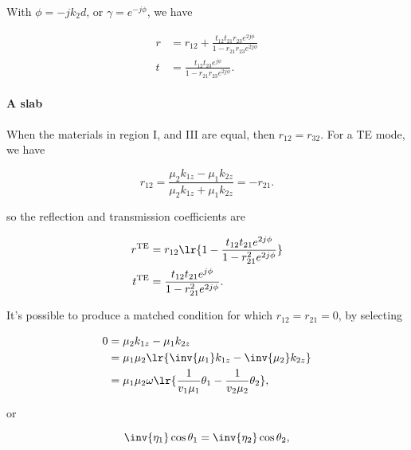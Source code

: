 With \( \phi = -j k_2 d \), or \( \gamma = e^{-j\phi} \), we have

\begin{dmath}\label{eqn:twoInterfaceNormal:180}
\boxed{
\begin{aligned}
r &= r_{12} + \frac{t_{12} t_{21} r_{23} e^{2 j \phi} }{1 - r_{21} r_{23} e^{2 j \phi}} \\
t &= \frac{ t_{12} t_{23} e^{j\phi}}{1 - r_{21} r_{23} e^{2 j \phi}}.
\end{aligned}
}
\end{dmath}

\paragraph{A slab}

When the materials in region I, and III are equal, then \( r_{12} = r_{32} \).  For a TE mode, we have

\begin{equation}\label{eqn:twoInterfaceNormal:200}
r_{12}
=
\frac{\mu_2 k_{1z} - \mu_1 k_{2z}}{\mu_2 k_{1z} + \mu_1 k_{2z}}
= -r_{21}.
\end{equation}

so the reflection and transmission coefficients are

\begin{dmath}\label{eqn:twoInterfaceNormal:220}
\begin{aligned}
r^{\textrm{TE}} &= r_{12} \lr{ 1 - \frac{t_{12} t_{21} e^{2 j \phi} }{1 - r_{21}^2 e^{2 j \phi}} } \\
t^{\textrm{TE}} &= \frac{ t_{12} t_{21} e^{j\phi}}{1 - r_{21}^2 e^{2 j \phi}}.
\end{aligned}
\end{dmath}

It's possible to produce a matched condition for which \( r_{12} = r_{21} = 0 \), by selecting

\begin{dmath}\label{eqn:twoInterfaceNormal:240}
\begin{aligned}
0
&= \mu_2 k_{1z} - \mu_1 k_{2z} \\
&= \mu_1 \mu_2 \lr{ \inv{\mu_1} k_{1z} - \inv{\mu_2} k_{2z} } \\
&= \mu_1 \mu_2 \omega \lr{ \frac{1}{v_1 \mu_1} \theta_1 - \frac{1}{v_2 \mu_2} \theta_2 },
\end{aligned}
\end{dmath}

or

\begin{dmath}\label{eqn:twoInterfaceNormal:260}
\inv{\eta_1} \cos\theta_1 = \inv{\eta_2} \cos\theta_2,
\end{dmath}

